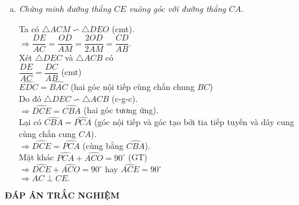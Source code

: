 \begin{bt}
{\begin{enumerate}[a)]
Vì $PCMO$ nội tiếp nên $\widehat{POC}=\widehat{PMC}$ (cùng chắn cung $PC$).\\
Mà $\widehat{DOE}=\widehat{POC}$ (đối đỉnh).\\
Nên $\widehat{DOE}=\widehat{AMC}$ (cùng bằng $\widehat{POC}$).\\
Xét $\triangle ACM$ và $\triangle DEO$ có\\
$\widehat{DOE}=\widehat{AMC}$ (cmt),\\
$\widehat{ODE}=\widehat{CAM}$ (hai góc nội tiếp cùng chắn cung $BC$ của đường tròn $(O)$).\\
Do đó $\triangle ACM\backsim \triangle DEO$ (g-g).\\
$\Rightarrow \dfrac{AC}{DE}=\dfrac{AM}{DO}\Rightarrow AM\cdot DE=AC\cdot DO.$
\item \textit{Chứng minh đường thẳng $CE$ vuông góc với đường thẳng $CA$.}\medskip

Ta có $\triangle ACM\backsim \triangle DEO$ (cmt).\\
$\Rightarrow \dfrac{DE}{AC}=\dfrac{OD}{AM}=\dfrac{2OD}{2AM}=\dfrac{CD}{AB}.$\\
Xét $\triangle DEC$ và $\triangle ACB$ có \\
$\dfrac{DE}{AC}=\dfrac{DC}{AB}$ (cmt)\\
$\widehat{EDC}=\widehat{BAC}$ (hai góc nội tiếp cùng chắn chung $BC$)\\
Do đó $\triangle DEC\backsim \triangle ACB$ (c-g-c).\\
$\Rightarrow \widehat{DCE}=\widehat{CBA}$ (hai góc tương ứng).\\
Lại có $\widehat{CBA}=\widehat{PCA}$ (góc nội tiếp và góc tạo bởi tia tiếp tuyến và dây cung cùng chắn cung $CA$).\\
$\Rightarrow \widehat{DCE}=\widehat{PCA}$ (cùng bằng $\widehat{CBA}$).\\
Mặt khác $\widehat{PCA}+\widehat{ACO}=90^\circ$ (GT)\\
$\Rightarrow \widehat{DCE}+\widehat{ACO}=90^\circ$ hay $\widehat{ACE}=90^\circ$\\
$\Rightarrow AC\perp CE.$
\end{enumerate}
}
\end{bt}
\newpage
\begin{center}
	\textbf{ĐÁP ÁN TRẮC NGHIỆM}
\end{center}
\begin{multicols}{10}
	
\end{multicols}